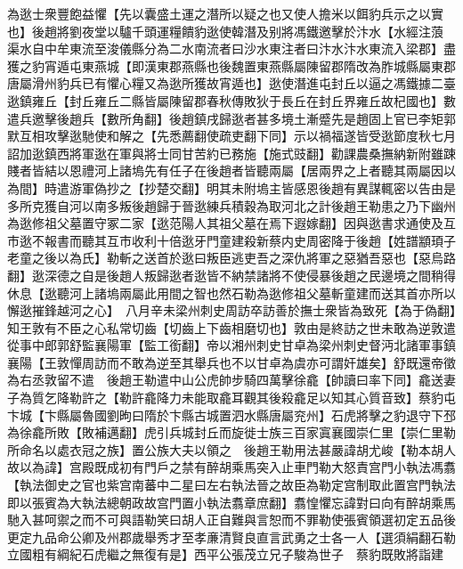 為逖士衆豐飽益懼【先以囊盛土運之潛所以疑之也又使人擔米以餌豹兵示之以實也】後趙將劉夜堂以驢千頭運糧饋豹逖使韓潛及别將馮鐵邀擊於汴水【水經注蒗渠水自中牟東流至浚儀縣分為二水南流者曰沙水東注者曰汴水汴水東流入梁郡】盡獲之豹宵遁屯東燕城【即漢東郡燕縣也後魏置東燕縣屬陳留郡隋改為胙城縣屬東郡唐屬滑州豹兵已有懼心糧又為逖所獲故宵遁也】逖使潛進屯封丘以逼之馮鐵據二臺逖鎮雍丘【封丘雍丘二縣皆屬陳留郡春秋傳敗狄于長丘在封丘界雍丘故杞國也】數遣兵邀擊後趙兵【數所角翻】後趙鎮戌歸逖者甚多境土漸蹙先是趙固上官已李矩郭默互相攻擊逖馳使和解之【先悉薦翻使疏吏翻下同】示以禍福遂皆受逖節度秋七月詔加逖鎮西將軍逖在軍與將士同甘苦約已務施【施式豉翻】勸課農桑撫納新附雖踈賤者皆結以恩禮河上諸塢先有任子在後趙者皆聽兩屬【居兩界之上者聽其兩屬因以為間】時遣游軍偽抄之【抄楚交翻】明其未附塢主皆感恩後趙有異謀輒密以告由是多所克獲自河以南多叛後趙歸于晉逖練兵積穀為取河北之計後趙王勒患之乃下幽州為逖修祖父墓置守冢二家【逖范陽人其祖父墓在焉下遐嫁翻】因與逖書求通使及互市逖不報書而聽其互市收利十倍逖牙門童建殺新蔡内史周密降于後趙【姓譜顓頊子老童之後以為氏】勒斬之送首於逖曰叛臣逃吏吾之深仇將軍之惡猶吾惡也【惡烏路翻】逖深德之自是後趙人叛歸逖者逖皆不納禁諸將不使侵暴後趙之民邊境之間稍得休息【逖聽河上諸塢兩屬此用間之智也然石勒為逖修祖父墓斬童建而送其首亦所以懈逖摧鋒越河之心】　八月辛未梁州刺史周訪卒訪善於撫士衆皆為致死【為于偽翻】知王敦有不臣之心私常切齒【切齒上下齒相磨切也】敦由是終訪之世未敢為逆敦遣從事中郎郭舒監襄陽軍【監工銜翻】帝以湘州刺史甘卓為梁州刺史督沔北諸軍事鎮襄陽【王敦憚周訪而不敢為逆至其舉兵也不以甘卓為虞亦可謂奸雄矣】舒既還帝徵為右丞敦留不遣　後趙王勒遣中山公虎帥步騎四萬擊徐龕【帥讀曰率下同】龕送妻子為質乞降勒許之【勒許龕降力未能取龕耳觀其後殺龕足以知其心質音致】蔡豹屯卞城【卞縣屬魯國劉昫曰隋於卞縣古城置泗水縣唐屬兖州】石虎將擊之豹退守下邳為徐龕所敗【敗補邁翻】虎引兵城封丘而旋徙士族三百家寘襄國崇仁里【崇仁里勒所命名以處衣冠之族】置公族大夫以領之　後趙王勒用法甚嚴諱胡尤峻【勒本胡人故以為諱】宫殿既成初有門戶之禁有醉胡乘馬突入止車門勒大怒責宫門小執法馮翥【執法御史之官也紫宫南蕃中二星曰左右執法晉之故臣為勒定宫制取此置宫門執法即以張賓為大執法總朝政故宫門置小執法翥章庶翻】翥惶懼忘諱對曰向有醉胡乘馬馳入甚呵禦之而不可與語勒笑曰胡人正自難與言恕而不罪勒使張賓領選初定五品後更定九品命公卿及州郡歲舉秀才至孝亷清賢良直言武勇之士各一人【選須絹翻石勒立國粗有綱紀石虎繼之無復有是】西平公張茂立兄子駿為世子　蔡豹既敗將詣建

